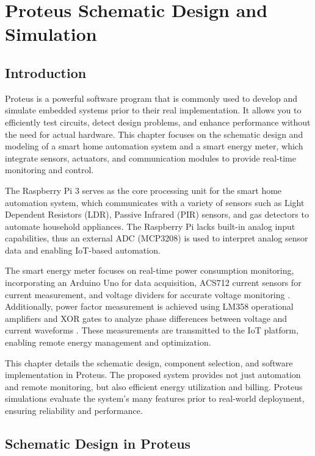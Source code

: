 \documentclass[a4paper,12pt]{report}
\begin{document}
\chapter{Proteus Schematic Design and Simulation}

\section{Introduction}
Proteus is a powerful software program that is commonly used to develop and simulate embedded systems prior to their real implementation.  It allows you to efficiently test circuits, detect design problems, and enhance performance without the need for actual hardware.  This chapter focuses on the schematic design and modeling of a smart home automation system and a smart energy meter, which integrate sensors, actuators, and communication modules to provide real-time monitoring and control.


The Raspberry Pi 3 serves as the core processing unit for the smart home automation system, which communicates with a variety of sensors such as Light Dependent Resistors (LDR), Passive Infrared (PIR) sensors, and gas detectors to automate household appliances.  The Raspberry Pi lacks built-in analog input capabilities, thus an external ADC (MCP3208) is used to interpret analog sensor data and enabling IoT-based automation\cite{valov2020home}.

The smart energy meter focuses on real-time power consumption monitoring, incorporating an Arduino Uno for data acquisition, ACS712 current sensors for current measurement, and voltage dividers for accurate voltage monitoring \cite{li2010application}. Additionally, power factor measurement is achieved using LM358 operational amplifiers and XOR gates to analyze phase differences between voltage and current waveforms \cite{Khair_2017}. These measurements are transmitted to the IoT platform, enabling remote energy management and optimization.

This chapter details the schematic design, component selection, and software implementation in Proteus.  The proposed system provides not just automation and remote monitoring, but also efficient energy utilization and billing.  Proteus simulations evaluate the system's many features prior to real-world deployment, ensuring reliability and performance.

\section{Schematic Design in Proteus}
\end{document}
